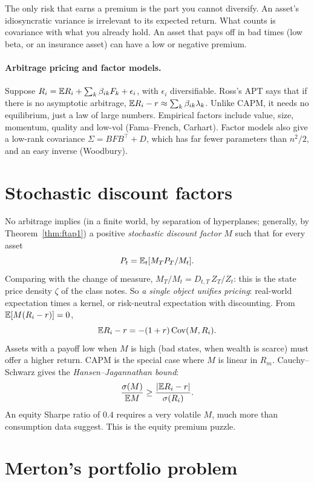 \begin{intuition}
The only risk that earns a premium is the part you cannot diversify. An asset's idiosyncratic variance is irrelevant to its expected return. What counts is covariance with what you already hold. An asset that pays off in bad times (low beta, or an insurance asset) can have a low or negative premium.
\end{intuition}

\paragraph{Arbitrage pricing and factor models.} Suppose $R_i=\mathbb{E} R_i+\sum_k\beta_{ik}F_k+\epsilon_i$, with $\epsilon_i$ diversifiable. Ross's APT says that if there is no asymptotic arbitrage, $\mathbb{E} R_i-r\approx\sum_k\beta_{ik}\lambda_k$. Unlike CAPM, it needs no equilibrium, just a law of large numbers. Empirical factors include value, size, momentum, quality and low-vol (Fama--French, Carhart). Factor models also give a low-rank covariance $\Sigma=BFB^\top+D$, which has far fewer parameters than $n^2/2$, and an easy inverse (Woodbury).

\section{Stochastic discount factors}

No arbitrage implies (in a finite world, by separation of hyperplanes; generally, by Theorem~\ref{thm:ftap1}) a positive \emph{stochastic discount factor} $M$ such that for every asset
\[
P_t=\mathbb{E}_t[M_{T}P_T/M_t].
\]
Comparing with the change of measure, $M_T/M_t=D_{t,T}\,Z_T/Z_t$: this is the state price density $\zeta$ of the class notes. So \emph{a single object unifies pricing}: real-world expectation times a kernel, or risk-neutral expectation with discounting. From $\mathbb{E}[M(R_i-r)]=0$,
\[
\mathbb{E} R_i-r=-(1+r)\operatorname{Cov}(M,R_i).
\]
Assets with a payoff low when $M$ is high (bad states, when wealth is scarce) must offer a higher return. CAPM is the special case where $M$ is linear in $R_m$. Cauchy--Schwarz gives the \emph{Hansen--Jagannathan bound}:
\[
\frac{\sigma(M)}{\mathbb{E} M}\ge\frac{|\mathbb{E} R_i-r|}{\sigma(R_i)}.
\]
An equity Sharpe ratio of $0.4$ requires a very volatile $M$, much more than consumption data suggest. This is the equity premium puzzle.

\section{Merton's portfolio problem}

